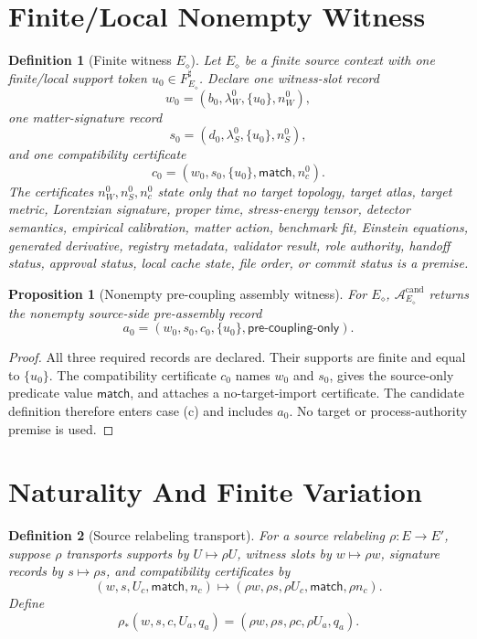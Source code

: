 \documentclass[11pt]{article}
\newtheorem{definition}{Definition}
\newtheorem{proposition}{Proposition}
\begin{document}
\section{Finite/Local Nonempty Witness}

\begin{definition}[Finite witness \(E_\diamond\)]
Let \(E_\diamond\) be a finite source context with one finite/local support
token \(u_0\in F_{E_\diamond}^\sharp\). Declare one witness-slot record
\[
  w_0=(b_0,\lambda_W^0,\{u_0\},n_W^0),
\]
one matter-signature record
\[
  s_0=(d_0,\lambda_S^0,\{u_0\},n_S^0),
\]
and one compatibility certificate
\[
  c_0=(w_0,s_0,\{u_0\},\mathsf{match},n_c^0).
\]
The certificates \(n_W^0,n_S^0,n_c^0\) state only that no target topology,
target atlas, target metric, Lorentzian signature, proper time,
stress-energy tensor, detector semantics, empirical calibration, matter
action, benchmark fit, Einstein equations, generated derivative, registry
metadata, validator result, role authority, handoff status, approval status,
local cache state, file order, or commit status is a premise.
\end{definition}

\begin{proposition}[Nonempty pre-coupling assembly witness]
For \(E_\diamond\), \(\mathcal{A}^{\mathrm{cand}}_{E_\diamond}\) returns the
nonempty source-side pre-assembly record
\[
  a_0=(w_0,s_0,c_0,\{u_0\},\mathsf{pre\text{-}coupling\text{-}only}).
\]
\end{proposition}

\begin{proof}
All three required records are declared. Their supports are finite and equal
to \(\{u_0\}\). The compatibility certificate \(c_0\) names \(w_0\) and
\(s_0\), gives the source-only predicate value \(\mathsf{match}\), and
attaches a no-target-import certificate. The candidate definition therefore
enters case (c) and includes \(a_0\). No target or process-authority premise
is used.
\end{proof}

\section{Naturality And Finite Variation}

\begin{definition}[Source relabeling transport]
For a source relabeling \(\rho:E\to E'\), suppose \(\rho\) transports supports
by \(U\mapsto \rho U\), witness slots by \(w\mapsto \rho w\), signature
records by \(s\mapsto \rho s\), and compatibility certificates by
\[
  (w,s,U_c,\mathsf{match},n_c)
  \mapsto
  (\rho w,\rho s,\rho U_c,\mathsf{match},\rho n_c).
\]
Define
\[
  \rho_*(w,s,c,U_a,q_a)
  =
  (\rho w,\rho s,\rho c,\rho U_a,q_a).
\]
\end{definition}
\end{document}
